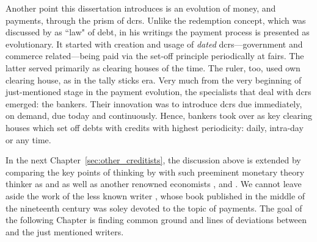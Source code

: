 Another point this dissertation introduces is an evolution of money, and payments, through the prism of \acfp{dcr}. Unlike the redemption concept, which was discussed by \citeauthor{innes1913} as ``law" of debt, in his writings the payment process is presented as evolutionary. It started with creation and usage of \textit{dated} \acp{dcr}---government and commerce related---being paid via the set-off principle periodically at fairs. The latter served primarily as clearing houses of the time. The ruler, too, used own clearing house, as in the tally sticks era. Very much from the very beginning of just-mentioned stage in the payment evolution, the specialists that deal with \acp{dcr} emerged: the bankers. Their innovation was to introduce \acp{dcr} due immediately, on demand, due today and continuously. Hence, bankers took over as key clearing houses which set off debts with credits with highest periodicity: daily, intra-day or any time. 

In the next Chapter~\ref{sec:other_creditists}, the discussion above is extended by comparing the key points of thinking by \citeauthor{innes1913} with such preeminent monetary theory thinker as \citeauthor{keynes1930a} and as well as another renowned economists \citeauthor{commons1936}, \citeauthor{schumpeter1934} and \citeauthor{minsky1986}. We cannot leave aside the work of the less known writer \citeauthor{colwell1859}, whose book published in the middle of the nineteenth century was soley devoted to the topic of payments. The goal of the following Chapter is finding common ground and lines of deviations between \citeauthor{innes1913} and the just mentioned writers.

